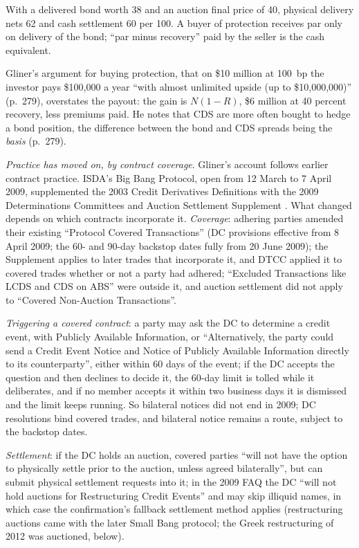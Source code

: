 \begin{qfmechanism}
With a delivered bond worth 38 and an auction final price of 40, physical delivery nets 62 and cash settlement 60 per 100. A buyer of protection receives par only on delivery of the bond; ``par minus recovery'' paid by the seller is the cash equivalent.

 Gliner's argument for buying protection, that on \$10 million at 100~bp the investor pays \$100,000 a year ``with almost unlimited upside (up to \$10,000,000)'' (p.~279), overstates the payout: the gain is $N(1-R)$, \$6 million at 40 percent recovery, less premiums paid. He notes that CDS are more often bought to hedge a bond position, the difference between the bond and CDS spreads being the \emph{basis} (p.~279).

 \emph{Practice has moved on, by contract coverage}. Gliner's account follows earlier contract practice. ISDA's Big Bang Protocol, open from 12 March to 7 April 2009, supplemented the 2003 Credit Derivatives Definitions with the 2009 Determinations Committees and Auction Settlement Supplement \citep[protocol page and FAQ]{isda-big-bang-2009}. What changed depends on which contracts incorporate it. \emph{Coverage}: adhering parties amended their existing ``Protocol Covered Transactions'' (DC provisions effective from 8 April 2009; the 60- and 90-day backstop dates fully from 20 June 2009); the Supplement applies to later trades that incorporate it, and DTCC applied it to covered trades whether or not a party had adhered; ``Excluded Transactions like LCDS and CDS on ABS'' were outside it, and auction settlement did not apply to ``Covered Non-Auction Transactions''.

\emph{Triggering a covered contract}: a party may ask the DC to determine a credit event, with Publicly Available Information, or ``Alternatively, the party could send a Credit Event Notice and Notice of Publicly Available Information directly to its counterparty'', either within 60 days of the event; if the DC accepts the question and then declines to decide it, the 60-day limit is tolled while it deliberates, and if no member accepts it within two business days it is dismissed and the limit keeps running. So bilateral notices did not end in 2009; DC resolutions bind covered trades, and bilateral notice remains a route, subject to the backstop dates.

\emph{Settlement}: if the DC holds an auction, covered parties ``will not have the option to physically settle prior to the auction, unless agreed bilaterally'', but can submit physical settlement requests into it; in the 2009 FAQ the DC ``will not hold auctions for Restructuring Credit Events'' and may skip illiquid names, in which case the confirmation's fallback settlement method applies (restructuring auctions came with the later Small Bang protocol; the Greek restructuring of 2012 was auctioned, below).


\end{qfmechanism}
